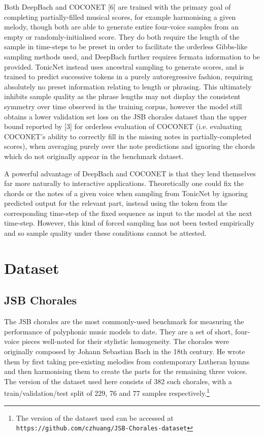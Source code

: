 \documentclass{article}
\begin{document}
Both DeepBach and COCONET [6] are trained with the primary goal of completing partially-filled musical scores, for example harmonising a given melody, though both are able to generate entire four-voice samples from an empty or randomly-initialised score. They do both require the length of the sample in time-steps to be preset in order to facilitate the orderless Gibbs-like sampling methods used, and DeepBach further requires fermata information to be provided. TonicNet instead uses ancestral sampling to generate scores, and is trained to predict successive tokens in a purely autoregressive fashion, requiring absolutely no preset information relating to length or phrasing. This ultimately inhibits sample quality as the phrase lengths may not display the consistent symmetry over time observed in the training corpus, however the model still obtains a lower validation set loss on the JSB chorales dataset than the upper bound reported by [3] for orderless evaluation of COCONET (i.e. evaluating COCONET's ability to correctly fill in the missing notes in partially-completed scores), when averaging purely over the note predictions and ignoring the chords which do not originally appear in the benchmark dataset.

A powerful advantage of DeepBach and COCONET is that they lend themselves far more naturally to interactive applications. Theoretically one could fix the chords or the notes of a given voice when sampling from TonicNet by ignoring predicted output for the relevant part, instead using the token from the corresponding time-step of the fixed sequence as input to the model at the next time-step. However, this kind of forced sampling has not been tested empirically and so sample quality under these conditions cannot be attested.

\section{Dataset}\label{sec:dataset}

\subsection{JSB Chorales}\label{subsec:jsb}

The JSB chorales are the most commonly-used benchmark for measuring the performance of polyphonic music models to date. They are a set of short, four-voice pieces well-noted for their stylistic homogeneity. The chorales were originally composed by Johann Sebastian Bach in the 18th century. He wrote them by first taking pre-existing melodies from contemporary Lutheran hymns and then harmonising them to create the parts for the remaining three voices. The version of the dataset used here consists of 382 such chorales, with a train/validation/test split of 229, 76 and 77 samples respectively.\footnote{ The version of the dataset used can be accessed at {\tt https://github.com/czhuang/JSB-Chorales-dataset} }
\end{document}
